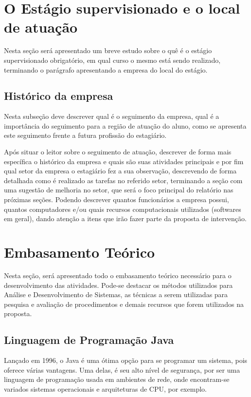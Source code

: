 \documentclass[12pt]{article}
\begin{document}
\section{O Estágio supervisionado e o local de atuação} \label{sec:oestagio}
Nesta seção será apresentado um breve estudo sobre o quê é o estágio supervisionado obrigatório, em qual curso o mesmo está sendo realizado, terminando o parágrafo apresentando a empresa do local do estágio.

\subsection{Histórico da empresa}
Nesta subseção deve descrever qual é o seguimento da empresa, qual é a importância do seguimento para a região de atuação do aluno, como se apresenta este seguimento frente a futura profissão do estagiário.

	Após situar o leitor sobre o seguimento de atuação, descrever de forma mais específica o histórico da empresa e quais são suas atividades principais e por fim qual setor da empresa o estagiário fez a sua observação, descrevendo de forma detalhada como é realizado as tarefas no referido setor, terminando a seção com uma sugestão de melhoria no setor, que será o foco principal do relatório nas próximas seções. Podendo descrever quantos funcionários a empresa possui, quantos computadores e/ou quais recursos computacionais utilizados (softwares em geral), dando atenção a itens que irão fazer parte da proposta de intervenção.

\section{Embasamento Teórico} \label{sec:embasteorico}

Nesta seção, será apresentado todo o embasamento teórico necessário para o desenvolvimento das atividades. Pode-se destacar os métodos utilizados para Análise e Desenvolvimento de Sistemas, as técnicas a serem utilizadas para pesquisa e avaliação de procedimentos e demais recursos que forem utilizados na proposta.


\subsection{Linguagem de Programação Java}

Lançado em 1996, o Java é uma ótima opção para se programar um sistema, pois oferece várias vantagens. Uma delas, é seu alto nível de segurança, por ser uma linguagem de programação usada em ambientes de rede, onde encontram-se variados sistemas operacionais e arquiteturas de CPU, por exemplo.
\end{document}
